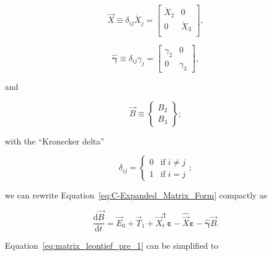 \begin{equation} \label{eq:X_hat_matrix_def}
	\hat{\vec{X}} 
	\equiv
	\delta_{ij} \dot{X}_{j} 
	= 
	\begin{bmatrix}
		\dot{X}_{2}		&	0	  \\
		0				&	\dot{X}_{3}	\\
	\end{bmatrix},
\end{equation} 

\begin{equation} \label{eq:gamma_hat_matrix_def}
	\hat{\bm{\gamma}}
	\equiv
	\delta_{ij} \gamma_{j}
	=
	\begin{bmatrix}
		\gamma_{2} & 0         \\
		0          & \gamma_{3}
	\end{bmatrix},
\end{equation}

\noindent{}and

\begin{equation} \label{eq:B_vec_def}
	\vec{B} 
	\equiv
	\begin{Bmatrix}	
		B_{2} \\
		B_{3}
	\end{Bmatrix};
\end{equation}

\noindent{}with the ``Kronecker delta''

\begin{equation}\label{eq:k_delta}
	\delta_{ij} 
	=
	\begin{cases}	
		0	&	\text{if  } i \neq j	\\
		1 	& 	\text{if  } i = j
	\end{cases};
\end{equation}

\noindent{}we can rewrite Equation~\ref{eq:C-Expanded_Matrix_Form}
compactly as

\begin{equation} \label{eq:matrix_leontief_pre_1}
	\frac{\mathrm{d}\vec{B}}{\mathrm{d}t} 
	= \vec{E}_{0}
	+ \vec{T}_{1}
	+ \vec{X}_{t}^{\mathrm{T}}\bm{\varepsilon} 
	- \hat{\vec{X}}\bm{\varepsilon}
	- \hat{\bm{\gamma}}\vec{B}.
\end{equation}

\noindent{}Equation~\ref{eq:matrix_leontief_pre_1} can be simplified to

